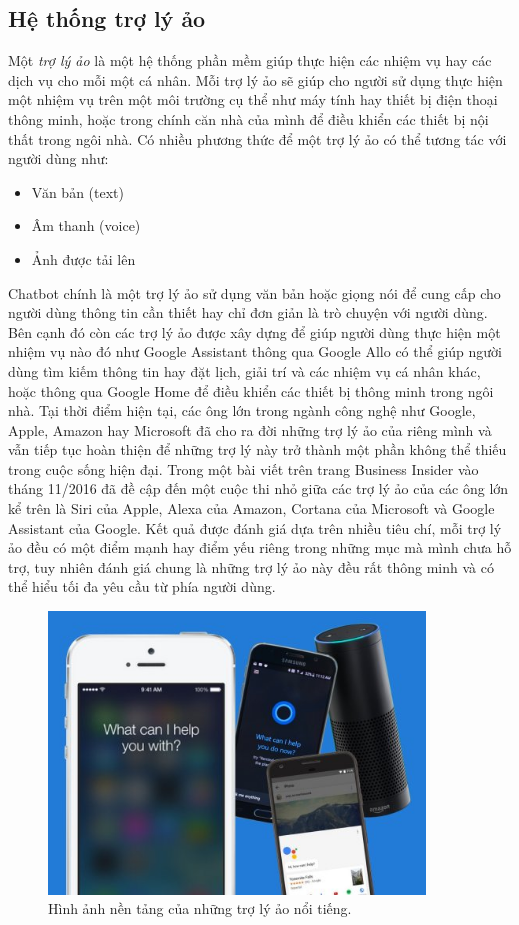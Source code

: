 \documentclass[12pt]{report}
\begin{document}
\subsection{Hệ thống trợ lý ảo}
Một \textit{trợ lý ảo} là một hệ thống phần mềm giúp thực hiện các nhiệm vụ hay các dịch vụ cho mỗi một cá nhân. Mỗi trợ lý ảo sẽ giúp cho người sử dụng thực hiện một nhiệm vụ trên một môi trường cụ thể như máy tính hay thiết bị điện thoại thông minh, hoặc trong chính căn nhà của mình để điều khiển các thiết bị nội thất trong ngôi nhà. Có nhiều phương thức để một trợ lý ảo có thể tương tác với người dùng như:

\begin{itemize}
	\item Văn bản (text)
	\item Âm thanh (voice)
	\item Ảnh được tải lên
\end{itemize}

Chatbot chính là một trợ lý ảo sử dụng văn bản hoặc giọng nói để cung cấp cho người dùng thông tin cần thiết hay chỉ đơn giản là trò chuyện với người dùng. Bên cạnh đó còn các trợ lý ảo được xây dựng để giúp người dùng thực hiện một nhiệm vụ nào đó như Google Assistant thông qua Google Allo có thể giúp người dùng tìm kiếm thông tin hay đặt lịch, giải trí và các nhiệm vụ cá nhân khác, hoặc thông qua Google Home để điều khiển các thiết bị thông minh trong ngôi nhà. Tại thời điểm hiện tại, các ông lớn trong ngành công nghệ như Google, Apple, Amazon hay Microsoft đã cho ra đời những trợ lý ảo của riêng mình và vẫn tiếp tục hoàn thiện để những trợ lý này trở thành một phần không thể thiếu trong cuộc sống hiện đại. Trong một bài viết trên trang Business Insider vào tháng 11/2016 đã đề cập đến một cuộc thi nhỏ giữa các trợ lý ảo của các ông lớn kể trên là Siri của Apple, Alexa của Amazon, Cortana của Microsoft và Google Assistant của Google\cite{va-compare}. Kết quả được đánh giá dựa trên nhiều tiêu chí, mỗi trợ lý ảo đều có một điểm mạnh hay điểm yếu riêng trong những mục mà mình chưa hỗ trợ, tuy nhiên đánh giá chung là những trợ lý ảo này đều rất thông minh và có thể hiểu tối đa yêu cầu từ phía người dùng. 

\begin{figure}[H]
  \centering
    \includegraphics[width=10cm]{Pics/Chap1/virtual-assistants.png}
  \caption{Hình ảnh nền tảng của những trợ lý ảo nổi tiếng\cite{va-compare}.}
\end{figure}
\end{document}
